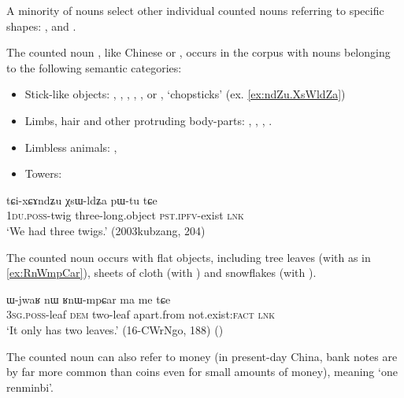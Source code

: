 A minority of nouns select other individual counted nouns referring to specific shapes: ,  and .

 
The counted noun , like Chinese  or , occurs in the corpus with nouns belonging to the following semantic categories:

\begin{itemize}
\item Stick-like objects:  , , , ,  ,  or , `chopsticks' (ex. \ref{ex:ndZu.XsWldZa})
\item Limbs, hair and other protruding body-parts: , ,  , .
\item Limbless animals:  ,  
\item Towers: 
\end{itemize} 

\begin{exe}
\ex \label{ex:ndZu.XsWldZa}
\gll  tɕi-xɕɤndʑu χsɯ-ldʑa pɯ-tu tɕe \\
\textsc{1du}.\textsc{poss}-twig three-long.object  \textsc{pst}.\textsc{ipfv}-exist \textsc{lnk} \\
\glt `We had three twigs.'  (2003kubzang, 204)
\end{exe}

The counted noun  occurs with flat objects, including tree leaves (with  as in \ref{ex:RnWmpCar}), sheets of cloth (with ) and snowflakes (with ).  

\begin{exe}
\ex \label{ex:RnWmpCar}
\gll ɯ-jwaʁ nɯ ʁnɯ-mpɕar ma me tɕe \\
\textsc{3sg}.\textsc{poss}-leaf \textsc{dem} two-leaf apart.from not.exist:\textsc{fact} \textsc{lnk} \\
\glt `It only has two leaves.'  (16-CWrNgo, 188)
()
\end{exe}

The counted noun  can also refer to money (in present-day China, bank notes are by far more common than coins even for small amounts of money), meaning `one renminbi'.

